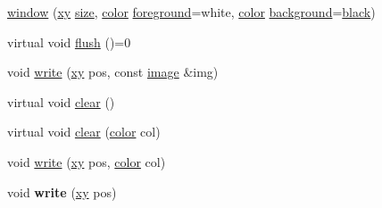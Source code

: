 \begin{DoxyCompactItemize}
\hyperlink{classhwlib_1_1window_a41696e8593067bcd0f55525a56d7adb7}{window} (\hyperlink{classhwlib_1_1xy}{xy} \hyperlink{classhwlib_1_1window_ad2ad5281c9c09d18010b19cb807d3eaa}{size}, \hyperlink{classhwlib_1_1color}{color} \hyperlink{classhwlib_1_1window_a812e3bf440309bf3280d34fa04eeb718}{foreground}=white, \hyperlink{classhwlib_1_1color}{color} \hyperlink{classhwlib_1_1window_a1ca47e79ec54ea8b2f38b41b42593d2d}{background}=\hyperlink{namespacehwlib_aa9c056fa29bc9af9f55d4b774bb3898a}{black})
\item 
virtual void \hyperlink{classhwlib_1_1window_ace994a6b215325973cdcea5c5519955c}{flush} ()=0
\item 
void \hyperlink{classhwlib_1_1window_a53cdf4933161d82ba6d24140c69c3335}{write} (\hyperlink{classhwlib_1_1xy}{xy} pos, const \hyperlink{classhwlib_1_1image}{image} \&img)
\item 
virtual void \hyperlink{classhwlib_1_1window_a5e781163353ce26cb4dc5b2cbe40ad05}{clear} ()
\item 
virtual void \hyperlink{classhwlib_1_1window_af4c20108781e8e182008a961d6613532}{clear} (\hyperlink{classhwlib_1_1color}{color} col)
\end{DoxyCompactItemize}
\textbf{ }\par
\begin{DoxyCompactItemize}
\item 
void \hyperlink{classhwlib_1_1window_af71f072f7b94f82647fc582b053d4576}{write} (\hyperlink{classhwlib_1_1xy}{xy} pos, \hyperlink{classhwlib_1_1color}{color} col)
\item 
\mbox{\label{classhwlib_1_1window_aa016a1cfaa02b1f1e95e5f4bd4be6e1e}} 
void {\bfseries write} (\hyperlink{classhwlib_1_1xy}{xy} pos)
\end{DoxyCompactItemize}

